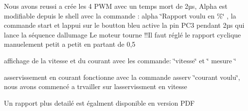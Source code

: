 Nous avons reussi a crée les 4 PWM avec un temps mort de 2µs, Alpha est modifiable depuis le shell avec la commande \+: alpha \char`\"{}\+Rapport voulu en \%\char`\"{} , la commande start et l\textquotesingle{}appui sur le boutton bleu active la pin PC3 pendant 2µs qui lance la séquence d\textquotesingle{}allumage Le moteur tourne !!\+Il faut réglé le rapport cyclique manuelement petit a petit en partant de 0,5

affichage de la vitesse et du courant avec les commande\+: \char`\"{}vitesse\char`\"{} et \char`\"{} mesure \char`\"{}

asservissement en courant fonctionne avec la commande asserv \char`\"{}courant voulu\char`\"{}, nous avons commencé a trvailler sur l\textquotesingle{}asservissment en vitesse

Un rapport plus detailé est égalment disponible en version PDF 